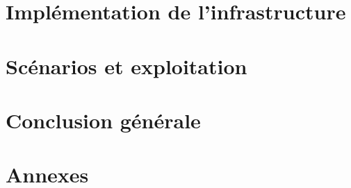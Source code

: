 \documentclass[12pt,a4paper]{report}
\begin{document}
\chapter{Implémentation de l'infrastructure}


\chapter{Scénarios et exploitation}


\chapter*{Conclusion générale}





\appendix
\chapter{Annexes}

\end{document}
